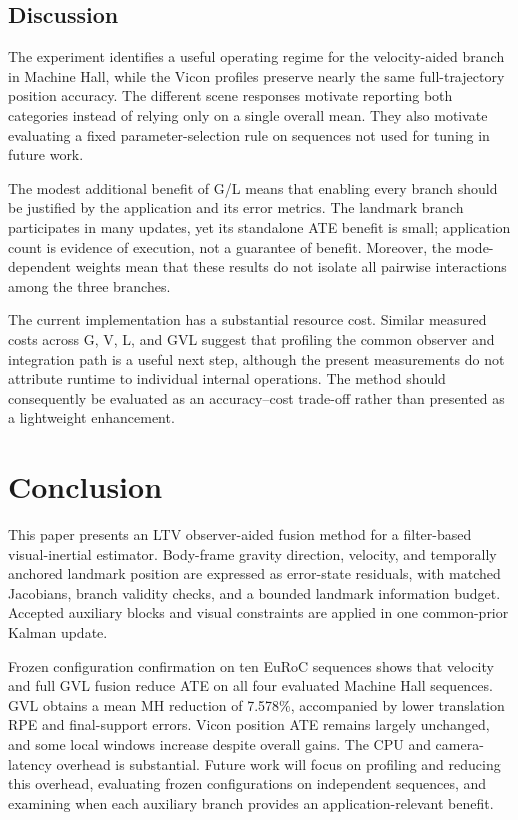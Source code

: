 \documentclass[a4paper,runningheads,twocolumn]{llncs}
\begin{document}
\subsection{Discussion}
The experiment identifies a useful operating regime for the velocity-aided branch in Machine Hall, while the Vicon profiles preserve nearly the same full-trajectory position accuracy. The different scene responses motivate reporting both categories instead of relying only on a single overall mean. They also motivate evaluating a fixed parameter-selection rule on sequences not used for tuning in future work.

The modest additional benefit of G/L means that enabling every branch should be justified by the application and its error metrics. The landmark branch participates in many updates, yet its standalone ATE benefit is small; application count is evidence of execution, not a guarantee of benefit. Moreover, the mode-dependent weights mean that these results do not isolate all pairwise interactions among the three branches.

The current implementation has a substantial resource cost. Similar measured costs across G, V, L, and GVL suggest that profiling the common observer and integration path is a useful next step, although the present measurements do not attribute runtime to individual internal operations. The method should consequently be evaluated as an accuracy--cost trade-off rather than presented as a lightweight enhancement.

\section{Conclusion}
This paper presents an LTV observer-aided fusion method for a filter-based visual-inertial estimator. Body-frame gravity direction, velocity, and temporally anchored landmark position are expressed as error-state residuals, with matched Jacobians, branch validity checks, and a bounded landmark information budget. Accepted auxiliary blocks and visual constraints are applied in one common-prior Kalman update.

Frozen configuration confirmation on ten EuRoC sequences shows that velocity and full GVL fusion reduce ATE on all four evaluated Machine Hall sequences. GVL obtains a mean MH reduction of 7.578\%, accompanied by lower translation RPE and final-support errors. Vicon position ATE remains largely unchanged, and some local windows increase despite overall gains. The CPU and camera-latency overhead is substantial. Future work will focus on profiling and reducing this overhead, evaluating frozen configurations on independent sequences, and examining when each auxiliary branch provides an application-relevant benefit.



\end{document}

